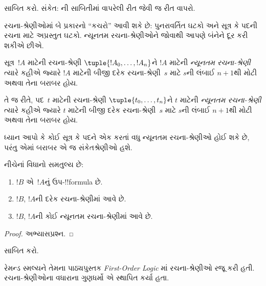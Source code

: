 \documentclass[../../../include/open-logic-section]{subfiles}
\begin{document}
\begin{prob}
 સાબિત કરો.
સંકેત: ની સાબિતીમાં
વાપરેલી રીત જેવી જ રીત વાપરો.
\end{prob}

રચના-શ્રેણીઓમાં બે પ્રકારનો ``કચરો'' આવી શકે છે: પુનરાવર્તિત ઘટકો
અને સૂત્ર કે પદની રચના માટે અપ્રસ્તુત ઘટકો. ન્યૂનતમ રચના-શ્રેણીઓને
જોવાથી આપણે બંનેને દૂર કરી શકીએ છીએ.

\begin{defn}
સૂત્ર~$!A$ માટેની રચના-શ્રેણી $\tuple{!A_0, \ldots, !A_n}$ને
$!A$ માટેની \emph{ન્યૂનતમ રચના-શ્રેણી} ત્યારે કહીએ જ્યારે $!A$ માટેની
બીજી દરેક રચના-શ્રેણી~$s$ માટે $s$ની લંબાઈ $n+1$થી મોટી અથવા તેના
બરાબર હોય.

તે જ રીતે, પદ~$t$ માટેની રચના-શ્રેણી $\tuple{t_0, \ldots, t_n}$ને
$t$ માટેની \emph{ન્યૂનતમ રચના-શ્રેણી} ત્યારે કહીએ જ્યારે $t$ માટેની
બીજી દરેક રચના-શ્રેણી~$s$ માટે $s$ની લંબાઈ $n+1$થી મોટી અથવા તેના
બરાબર હોય.
\end{defn}

ધ્યાન આપો કે કોઈ સૂત્ર કે પદને એક કરતાં વધુ ન્યૂનતમ રચના-શ્રેણીઓ
હોઈ શકે છે, પરંતુ એમાં બરાબર એ જ સંકેતશ્રેણીઓ હશે.

\begin{prop}
નીચેનાં વિધાનો સમતુલ્ય છે:
\begin{enumerate}
    \item $!B$ એ~$!A$નું ઉપ-!!{formula} છે.
    \item $!B$, $!A$ની દરેક રચના-શ્રેણીમાં આવે છે.
    \item $!B$, $!A$ની કોઈ ન્યૂનતમ રચના-શ્રેણીમાં આવે છે.
\end{enumerate}
\end{prop}

\begin{proof}
અભ્યાસપ્રશ્ન.
\end{proof}

\begin{prob}
 સાબિત કરો.
\end{prob}

\begin{history}
રેમન્ડ સ્મલ્યને તેમના પાઠ્યપુસ્તક \emph{First-Order Logic}
\citep{Smullyan1968}માં રચના-શ્રેણીઓ રજૂ કરી હતી. રચના-શ્રેણીઓના
વધારાના ગુણધર્મો \citet{Zuckerman1973}એ સ્થાપિત કર્યા હતા.
\end{history}
\end{document}
